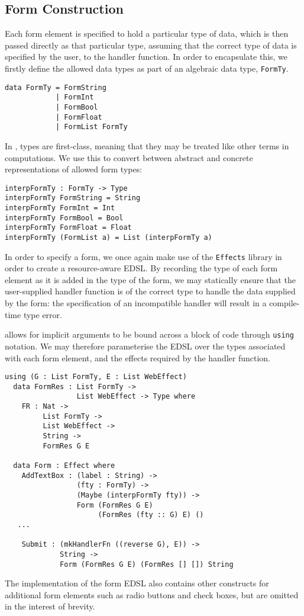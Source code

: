 \documentclass[preprint]{sigplanconf}
\begin{document}
\subsection{Form Construction}
Each form element is specified to hold a particular type of data, which is then passed directly as that particular type, assuming that the correct type of data is specified by the user, to the handler function. In order to encapsulate this, we firstly define the allowed data types as part of an algebraic data type, \texttt{FormTy}.
{\small
\begin{verbatim}
data FormTy = FormString
            | FormInt
            | FormBool
            | FormFloat
            | FormList FormTy 
\end{verbatim}
}
In \idris{}, types are first-class, meaning that they may be treated like other terms in computations. We use this to convert between abstract and concrete representations of allowed form types:
{\small
\begin{verbatim}
interpFormTy : FormTy -> Type
interpFormTy FormString = String
interpFormTy FormInt = Int
interpFormTy FormBool = Bool
interpFormTy FormFloat = Float
interpFormTy (FormList a) = List (interpFormTy a)
\end{verbatim}
}
%
In order to specify a form, we once again make use of the \texttt{Effects} library in order to create a resource-aware EDSL. By recording the type of each form element as it is added in the type of the form, we may statically ensure that the user-supplied handler function is of the correct type to handle the data supplied by the form: the specification of an incompatible handler will result in a compile-time type error.

\idris{} allows for implicit arguments to be bound across a block of code through \texttt{using} notation. We may therefore parameterise the EDSL over the types associated with each form element, and the effects required by the handler function.

{\small
\begin{verbatim}
using (G : List FormTy, E : List WebEffect)
  data FormRes : List FormTy -> 
                 List WebEffect -> Type where
    FR : Nat -> 
         List FormTy -> 
         List WebEffect -> 
         String -> 
         FormRes G E
  
  data Form : Effect where
    AddTextBox : (label : String) -> 
                 (fty : FormTy) -> 
                 (Maybe (interpFormTy fty)) -> 
                 Form (FormRes G E) 
                      (FormRes (fty :: G) E) () 
   ...
   
    Submit : (mkHandlerFn ((reverse G), E)) ->
             String -> 
             Form (FormRes G E) (FormRes [] []) String
\end{verbatim}
}
The implementation of the form EDSL also contains other constructs for additional form elements such as radio buttons and check boxes, but are omitted in the interest of brevity.
\end{document}
